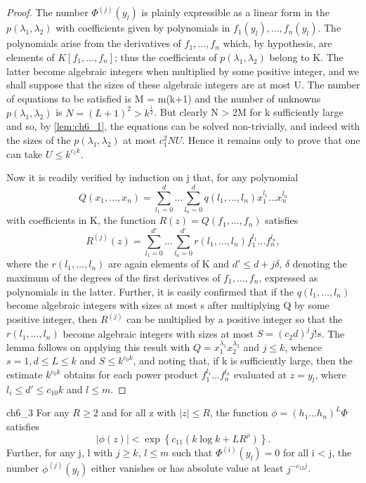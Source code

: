 \begin{proof}
The number $\Phi^{(j)}(y_l)$ is plainly expressible as a linear form in the $p(\lambda_1, \lambda_2)$ with coefficients given by polynomials in $f_1(y_l), \dots, f_n(y_l)$. The polynomials arise from the derivatives of $f_1, \dots, f_n$ which, by hypothesis, are elements of $K[f_1, \dots, f_n]$; thus the coefficients of $p(\lambda_1, \lambda_2)$ belong to K. The latter become algebraic integers when multiplied by some positive integer, and we shall suppose that the sizes of these algebraic integers are at most U. The number of equations to be satisfied is M = m(k+1) and the number of unknowns $p(\lambda_1, \lambda_2)$ is $N = (L+1)^2 > k^{\frac{1}{2}}$. But clearly N > 2M for k sufficiently large and so, by \autoref{lem:ch6_1}, the equations can be solved non-trivially, and indeed with the sizes of the $p(\lambda_1, \lambda_2)$ at most $c_1^2NU$. Hence it remains only to prove that one can take $U \leq k^{c_1k}$.

Now it is readily verified by induction on j that, for any polynomial
\[Q(x_1, \dots, x_n) = \sum_{l_1=0}^{d} \dots \sum_{l_n=0}^{d} q(l_1, \dots, l_n) x_1^{l_1} \dots x_n^{l_n}\]
with coefficients in K, the function $R(z) = Q(f_1, \dots, f_n)$ satisfies
\[R^{(j)}(z) = \sum_{l_1=0}^{d'} \dots \sum_{l_n=0}^{d'} r(l_1, \dots, l_n) f_1^{l_1} \dots f_n^{l_n},\]
where the $r(l_1, \dots, l_n)$ are again elements of K and $d' \leq d + j\delta$, $\delta$ denoting the maximum of the degrees of the first derivatives of $f_1, \dots, f_n$, expressed as polynomials in the latter. Further, it is easily confirmed that if the $q(l_1, \dots, l_n)$ become algebraic integers with sizes at most s after multiplying Q by some positive integer, then $R^{(j)}$ can be multiplied by a positive integer so that the $r(l_1, \dots, l_n)$ become algebraic integers with sizes at most $S = (c_2d)^j j! s$. The lemma follows on applying this result with $Q = x_1^{\lambda_1} x_2^{\lambda_2}$ and $j \leq k$, whence $s = 1, d \leq L \leq k$ and $S \leq k^{c_0 k}$, and noting that, if k is sufficiently large, then the estimate $k^{c_0 k}$ obtains for each power product $f_1^{l_1} \dots f_n^{l_n}$ evaluated at $z = y_l$, where $l_i \leq d' \leq c_{10} k$ and $l \leq m$.
\end{proof}

\begin{mylemma}{}{ch6_3}
For any $R \ge 2$ and for all z with $|z| \le R$, the function $\phi = (h_1 \dots h_n)^L \Phi$ satisfies
\[|\phi(z)| < \exp\left\{c_{11}(k\log k + LR^{\rho})\right\}.\]
Further, for any j, l with $j \ge k$, $l \le m$ such that $\Phi^{(i)}(y_l) = 0$ for all i < j, the number $\phi^{(j)}(y_l)$ either vanishes or has absolute value at least $j^{-c_{12}j}$.
\end{mylemma}

